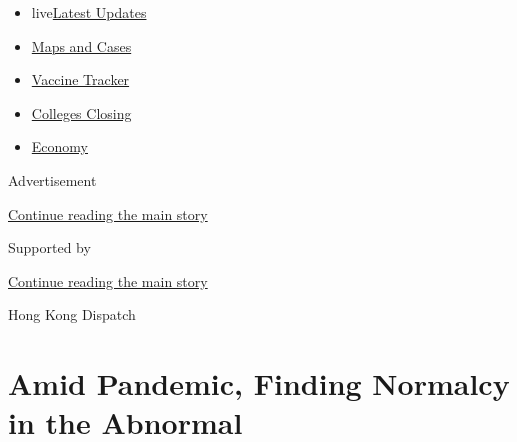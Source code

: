 \begin{itemize}
\tightlist
\item
  live\href{https://www.nytimes3xbfgragh.onion/2020/08/21/world/covid-19-coronavirus.html?name=styln-coronavirus-national\&region=TOP_BANNER\&variant=undefined\&block=storyline_menu_recirc\&action=click\&pgtype=Article\&impression_id=01b0b861-e3a1-11ea-8b08-6ddcf202df60}{Latest
  Updates}
\item
  \href{https://www.nytimes3xbfgragh.onion/interactive/2020/us/coronavirus-us-cases.html?name=styln-coronavirus-national\&region=TOP_BANNER\&variant=undefined\&block=storyline_menu_recirc\&action=click\&pgtype=Article\&impression_id=01b0df70-e3a1-11ea-8b08-6ddcf202df60}{Maps
  and Cases}
\item
  \href{https://www.nytimes3xbfgragh.onion/interactive/2020/science/coronavirus-vaccine-tracker.html?name=styln-coronavirus-national\&region=TOP_BANNER\&variant=undefined\&block=storyline_menu_recirc\&action=click\&pgtype=Article\&impression_id=01b0df71-e3a1-11ea-8b08-6ddcf202df60}{Vaccine
  Tracker}
\item
  \href{https://www.nytimes3xbfgragh.onion/2020/08/19/us/colleges-closing-covid.html?name=styln-coronavirus-national\&region=TOP_BANNER\&variant=undefined\&block=storyline_menu_recirc\&action=click\&pgtype=Article\&impression_id=01b0df72-e3a1-11ea-8b08-6ddcf202df60}{Colleges
  Closing}
\item
  \href{https://www.nytimes3xbfgragh.onion/live/2020/08/20/business/stock-market-today-coronavirus?name=styln-coronavirus-national\&region=TOP_BANNER\&variant=undefined\&block=storyline_menu_recirc\&action=click\&pgtype=Article\&impression_id=01b0df73-e3a1-11ea-8b08-6ddcf202df60}{Economy}
\end{itemize}

Advertisement

\protect\hyperlink{after-top}{Continue reading the main story}

Supported by

\protect\hyperlink{after-sponsor}{Continue reading the main story}

Hong Kong Dispatch

\hypertarget{amid-pandemic-finding-normalcy-in-the-abnormal}{%
\section{Amid Pandemic, Finding Normalcy in the
Abnormal}\label{amid-pandemic-finding-normalcy-in-the-abnormal}}

